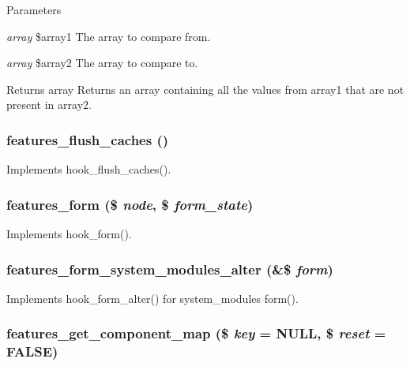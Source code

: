\begin{DoxyParams}{Parameters}
\item[{\em array}]\$array1 The array to compare from. \item[{\em array}]\$array2 The array to compare to.\end{DoxyParams}
\begin{DoxyReturn}{Returns}
array Returns an array containing all the values from array1 that are not present in array2. 
\end{DoxyReturn}
\hypertarget{features_8module_a11ac8740ad0c9745b94a37e7da421d2b}{
\subsubsection[{features\_\-flush\_\-caches}]{\setlength{\rightskip}{0pt plus 5cm}features\_\-flush\_\-caches ()}}
\label{features_8module_a11ac8740ad0c9745b94a37e7da421d2b}
Implements hook\_\-flush\_\-caches(). \hypertarget{features_8module_a6a4b2e2f866538b3c0c7d950aea3f80f}{
\subsubsection[{features\_\-form}]{\setlength{\rightskip}{0pt plus 5cm}features\_\-form (\$ {\em node}, \/  \$ {\em form\_\-state})}}
\label{features_8module_a6a4b2e2f866538b3c0c7d950aea3f80f}
Implements hook\_\-form(). \hypertarget{features_8module_a8035300a21d0bf61d8cbf8caa4f3c19b}{
\subsubsection[{features\_\-form\_\-system\_\-modules\_\-alter}]{\setlength{\rightskip}{0pt plus 5cm}features\_\-form\_\-system\_\-modules\_\-alter (\&\$ {\em form})}}
\label{features_8module_a8035300a21d0bf61d8cbf8caa4f3c19b}
Implements hook\_\-form\_\-alter() for system\_\-modules form(). \hypertarget{features_8module_a0b9ee0b432af2d3709e1f413923c3ae2}{
\subsubsection[{features\_\-get\_\-component\_\-map}]{\setlength{\rightskip}{0pt plus 5cm}features\_\-get\_\-component\_\-map (\$ {\em key} = {\ttfamily NULL}, \/  \$ {\em reset} = {\ttfamily FALSE})}}
